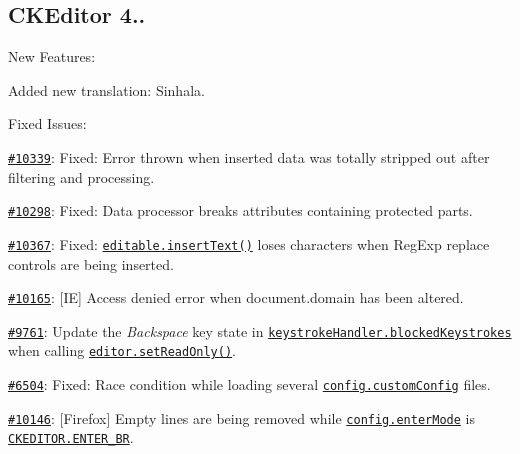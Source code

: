 {\ttfamily \subsection*{C\+K\+Editor 4..}}

{\ttfamily }

{\ttfamily New Features\+:}

{\ttfamily 
\begin{DoxyItemize}
\item Added new translation\+: Sinhala.
\end{DoxyItemize}}

{\ttfamily Fixed Issues\+:}

{\ttfamily 
\begin{DoxyItemize}
\item \href{http://dev.ckeditor.com/ticket/10339}{\tt \#10339}\+: Fixed\+: Error thrown when inserted data was totally stripped out after filtering and processing.
\item \href{http://dev.ckeditor.com/ticket/10298}{\tt \#10298}\+: Fixed\+: Data processor breaks attributes containing protected parts.
\item \href{http://dev.ckeditor.com/ticket/10367}{\tt \#10367}\+: Fixed\+: \href{http://docs.ckeditor.com/#!/api/CKEDITOR.editable-method-insertText}{\tt {\ttfamily editable.\+insert\+Text()}} loses characters when {\ttfamily Reg\+Exp} replace controls are being inserted.
\item \href{http://dev.ckeditor.com/ticket/10165}{\tt \#10165}\+: \mbox{[}IE\mbox{]} Access denied error when {\ttfamily document.\+domain} has been altered.
\item \href{http://dev.ckeditor.com/ticket/9761}{\tt \#9761}\+: Update the {\itshape Backspace} key state in \href{http://docs.ckeditor.com/#!/api/CKEDITOR.keystrokeHandler-property-blockedKeystrokes}{\tt {\ttfamily keystroke\+Handler.\+blocked\+Keystrokes}} when calling \href{http://docs.ckeditor.com/#!/api/CKEDITOR.editor-method-setReadOnly}{\tt {\ttfamily editor.\+set\+Read\+Only()}}.
\item \href{http://dev.ckeditor.com/ticket/6504}{\tt \#6504}\+: Fixed\+: Race condition while loading several \href{http://docs.ckeditor.com/#!/api/CKEDITOR.config-cfg-customConfig}{\tt {\ttfamily config.\+custom\+Config}} files.
\item \href{http://dev.ckeditor.com/ticket/10146}{\tt \#10146}\+: \mbox{[}Firefox\mbox{]} Empty lines are being removed while \href{http://docs.ckeditor.com/#!/api/CKEDITOR.config-cfg-enterMode}{\tt {\ttfamily config.\+enter\+Mode}} is \href{http://docs.ckeditor.com/#!/api/CKEDITOR-property-ENTER_BR}{\tt {\ttfamily C\+K\+E\+D\+I\+T\+O\+R.\+E\+N\+T\+E\+R\+\_\+\+BR}}.

\end{DoxyItemize}}
